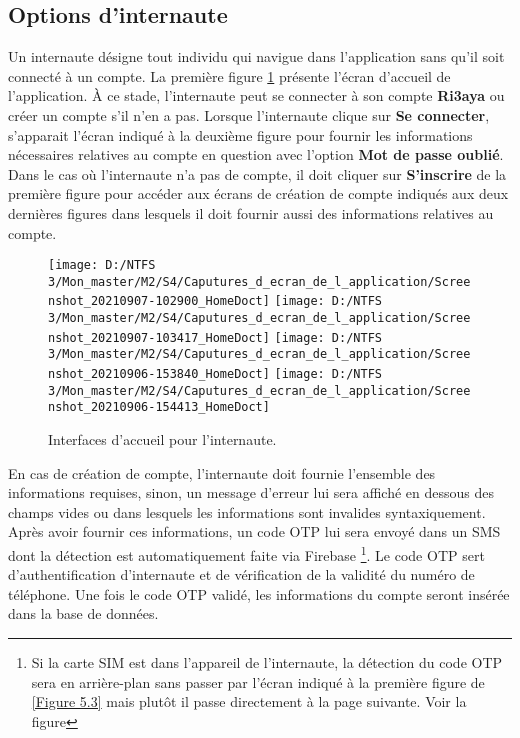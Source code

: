 \subsection{Options d’internaute}
Un internaute désigne tout individu qui navigue dans l’application sans qu’il soit connecté à un compte. \newline 
La première figure \ref{Figure 5.2} présente l’écran d’accueil de l'application. À ce stade, l’internaute peut se connecter à son compte \textbf{Ri3aya} ou créer un compte s’il n’en a pas. Lorsque l’internaute clique sur \textbf{Se connecter}, s'apparait l'écran indiqué à la deuxième figure pour fournir les informations nécessaires relatives au compte en question avec l'option \textbf{Mot de passe oublié}. Dans le cas où l'internaute n'a pas de compte, il doit cliquer sur \textbf{S'inscrire} de la première figure pour accéder aux écrans de création de compte indiqués aux deux dernières figures dans lesquels il doit fournir aussi des informations relatives au compte.
\begin{figure}[h]
	\texttt{[image: D:/NTFS 3/Mon\_master/M2/S4/Caputures\_d\_ecran\_de\_l\_application/Screenshot\_20210907-102900\_HomeDoct]}
	\texttt{[image: D:/NTFS 3/Mon\_master/M2/S4/Caputures\_d\_ecran\_de\_l\_application/Screenshot\_20210907-103417\_HomeDoct]}
	\texttt{[image: D:/NTFS 3/Mon\_master/M2/S4/Caputures\_d\_ecran\_de\_l\_application/Screenshot\_20210906-153840\_HomeDoct]}
	\texttt{[image: D:/NTFS 3/Mon\_master/M2/S4/Caputures\_d\_ecran\_de\_l\_application/Screenshot\_20210906-154413\_HomeDoct]}
	\centering
	\caption{Interfaces d'accueil pour l'internaute.}
	\label{Figure 5.2}
\end{figure}
\newline
En cas de création de compte, l’internaute doit fournie l’ensemble des informations requises, sinon, un message d’erreur lui sera affiché en dessous des champs vides ou dans lesquels les informations sont invalides syntaxiquement. Après avoir fournir ces informations, un code \gls{OTP} lui sera envoyé dans un SMS dont la détection est automatiquement faite via Firebase \footnote{Si la carte SIM est dans l'appareil de l'internaute, la détection du code \gls{OTP} sera en arrière-plan sans passer par l'écran indiqué à la première figure de \ref{Figure 5.3} mais plutôt il passe directement à la page suivante. Voir la figure}. Le code \gls{OTP} sert d’authentification d’internaute et de vérification de la validité du numéro de téléphone. Une fois le code \gls{OTP} validé, les informations du compte seront insérée dans la base de données.

